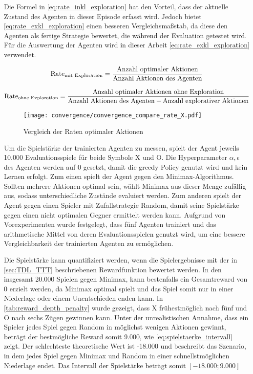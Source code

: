 Die Formel in \cref{eq:rate_inkl_exploration} hat den Vorteil, dass der aktuelle Zustand des Agenten in dieser Episode erfasst wird. 
Jedoch bietet \cref{eq:rate_exkl_exploration} einen besseren Vergleichsmaßstab, da diese den Agenten als fertige Strategie bewertet, die während der Evaluation getestet wird. 
Für die Auswertung der Agenten wird in dieser Arbeit \cref{eq:rate_exkl_exploration} verwendet. 

\begin{equation}\label{eq:rate_inkl_exploration}\equationentry{Rate optimaler Aktionen \inkl Exploration}
   \text{Rate}_{\text{mit Exploration}} = \frac{\text{Anzahl optimaler Aktionen}}{\text{Anzahl Aktionen des Agenten}}
\end{equation}

\begin{equation}\label{eq:rate_exkl_exploration}\equationentry{Rate optimaler Aktionen \exkl Exploration}
   \text{Rate}_{\text{ohne Exploration}} = \frac{\text{Anzahl optimaler Aktionen ohne Exploration}}{\text{Anzahl Aktionen des Agenten} - \text{Anzahl explorativer Aktionen}}
\end{equation}

\begin{figure}[h]
    \centering
    \texttt{[image: convergence/convergence\_compare\_rate\_X.pdf]}
    \caption{Vergleich der Raten optimaler Aktionen}
    \label{fig:compare_rate}
\end{figure}

Um die Spielstärke der trainierten Agenten zu messen, spielt der Agent jeweils 10.000 Evaluationsspiele für beide Symbole X und O. 
Die Hyperparameter $\alpha, \epsilon$ des Agenten werden auf 0 gesetzt, damit die greedy Policy genutzt wird und kein Lernen erfolgt. 
Zum einen spielt der Agent gegen den Minimax-Algorithmus. 
Sollten mehrere Aktionen optimal sein, wählt Minimax aus dieser Menge zufällig aus, sodass unterschiedliche Zustände evaluiert werden. 
Zum anderen spielt der Agent gegen einen Spieler mit Zufallstrategie Random, damit seine Spielstärke gegen einen nicht optimalen Gegner ermittelt werden kann. 
Aufgrund von Vorexperimenten wurde festgelegt, dass fünf Agenten trainiert und das arithmetische Mittel von deren Evaluationsspielen genutzt wird, um eine bessere Vergleichbarkeit der trainierten Agenten zu ermöglichen.

Die Spielstärke kann quantifiziert werden, wenn die Spielergebnisse mit der in \cref{sec:TDL_TTT} beschriebenen Rewardfunktion bewertet werden.
In den insgesamt 20.000 Spielen gegen Minimax, kann bestenfalls ein Gesamtreward von 0 erzielt werden, da Minimax optimal spielt und das Spiel somit nur in einer Niederlage oder einem Unentschieden enden kann. 
In \cref{tab:reward_depth_penalty} wurde gezeigt, dass X frühestmöglich nach fünf und O nach sechs Zügen gewinnen kann. 
Unter der unrealistischen Annahme, dass ein Spieler jedes Spiel gegen Random in möglichst wenigen Aktionen gewinnt, beträgt der bestmögliche Reward somit 9.000, wie \cref{eq:spielstaerke_intervall} zeigt. 
Der schlechteste theoretische Wert ist -18.000 und beschreibt das Szenario, in dem jedes Spiel gegen Minimax und Random in einer schnellstmöglichen Niederlage endet.
Das Intervall der Spielstärke beträgt somit $[-18.000;9.000]$

